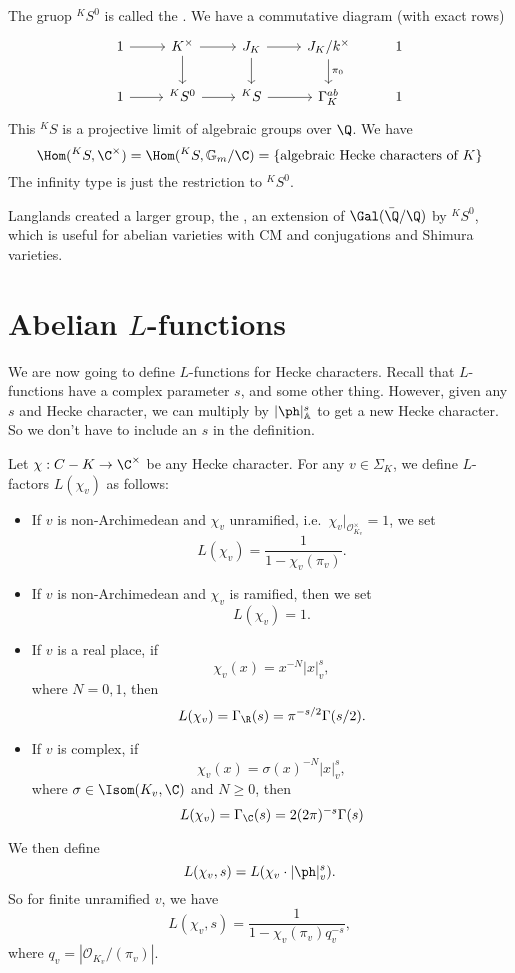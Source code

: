 \documentclass[a4paper]{article}
\renewcommand\G{\mathbb{G}}
\newcommand\A{\mathbb{A}}
\begin{document}
The gruop $^KS^0$ is called the . We have a commutative diagram (with exact rows)
\[
  \begin{tikzcd}
    1 \ar[r] & K^\times \ar[r] \ar[d] & J_K \ar[r] \ar[d] & J_K/k^\times \ar[d, "\pi_0"] & 1\\
    1 \ar[r] & ^KS^0 \ar[r] & ^KS \ar[r] & \Gamma^{ab}_K & 1
  \end{tikzcd}
\]
This $^KS$ is a projective limit of algebraic groups over $\Q$. We have
\[
  \Hom(^KS, \C^\times) = \Hom(^KS, \G_m/\C) = \{\text{algebraic Hecke characters of $K$}\}
\]
The infinity type is just the restriction to $^KS^0$.

Langlands created a larger group, the , an extension of $\Gal(\bar{\Q}/\Q)$ by $^K S^0$, which is useful for abelian varieties with CM and conjugations and Shimura varieties.

\section{Abelian \texorpdfstring{$L$}{L}-functions}
We are now going to define $L$-functions for Hecke characters. Recall that $L$-functions have a complex parameter $s$, and some other thing. However, given any $s$ and Hecke character, we can multiply by $|\ph|_{\A}^s$ to get a new Hecke character. So we don't have to include an $s$ in the definition.

Let $\chi: C-K \to \C^\times$ be any Hecke character. For any $v \in \Sigma_K$, we define $L$-factors $L(\chi_v)$ as follows:
\begin{itemize}
  \item If $v$ is non-Archimedean and $\chi_v$ unramified, i.e.\ $\chi_v|_{\mathcal{O}_{K_v}^\times} = 1$, we set
    \[
      L(\chi_v) = \frac{1}{1 - \chi_v(\pi_v)}.
    \]
  \item If $v$ is non-Archimedean and $\chi_v$ is ramified, then we set
    \[
      L(\chi_v) = 1.
    \]
  \item If $v$ is a real place, if
    \[
      \chi_v(x) = x^{-N} |x|_v^s,
    \]
    where $N = 0, 1$, then
    \[
      L(\chi_v) = \Gamma_\R(s) = \pi^{-s/2} \Gamma(s/2).
    \]
  \item If $v$ is complex, if
    \[
      \chi_v(x) = \sigma(x)^{-N} |x|_v^s,
    \]
    where $\sigma \in \Isom(K_v, \C)$ and $N \geq 0$, then
    \[
      L(\chi_v) = \Gamma_\C(s) = 2 (2\pi)^{-s} \Gamma(s)
    \]
\end{itemize}
We then define
\[
  L(\chi_v, s) = L(\chi_v \cdot |\ph|_v^s).
\]
So for finite unramified $v$, we have
\[
  L(\chi_v, s) = \frac{1}{1 - \chi_v(\pi_v) q_v^{-s}},
\]
where $q_v = |\mathcal{O}_{K_v}/(\pi_v)|$.
\printindex
\end{document}
